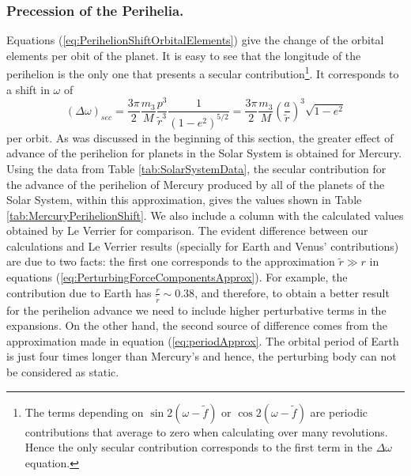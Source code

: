 \subsubsection{Precession of the Perihelia.}
Equations (\ref{eq:PerihelionShiftOrbitalElements}) give the change of the orbital elements per obit of the planet. It is easy to see that the longitude of the perihelion is the only one that presents a secular contribution\footnote{The terms depending on $\sin 2(\omega - \tilde{f})$ or $\cos 2(\omega - \tilde{f})$ are periodic contributions that average to zero when calculating over many revolutions. Hence the only secular contribution corresponds to the first term in the $\Delta \omega$ equation.}. It corresponds to a shift in $\omega$ of
\begin{equation}
\left( \Delta \omega \right)_{sec} = \frac{3 \pi}{2} \frac{m_3}{M} \frac{p^3}{\tilde{r}^3} \frac{1}{(1-e^2)^{5/2}} =  \frac{3 \pi}{2} \frac{m_3}{M} \left( \frac{a}{\tilde{r}} \right)^3  \sqrt{1-e^2}
\end{equation}
per orbit. As was discussed in the beginning of this section, the greater effect of advance of the perihelion for planets in the Solar System is obtained for Mercury. Using the data from Table \ref{tab:SolarSystemData}, the secular contribution for the advance of the perihelion of Mercury produced by all of the planets of the Solar System, within this approximation, gives the values shown in Table \ref{tab:MercuryPerihelionShift}. We also include a column with the calculated values obtained by Le Verrier \cite{LeVerrier1859, Krizek2017} for comparison. The evident difference between our calculations and Le Verrier results (specially for Earth and Venus' contributions) are due to two facts: the first one corresponds to the approximation $\tilde{r} \gg r$ in equations (\ref{eq:PerturbingForceComponentsApprox}). For example, the contribution due to Earth has $\frac{r}{\tilde{r}}  \sim  0.38$, and therefore, to obtain a better result for the perihelion advance we need to include higher perturbative terms in the expansions. On the other hand, the second source of difference comes from the approximation made in equation (\ref{eq:periodApprox}. The orbital period of Earth is just four times longer than Mercury's and hence, the perturbing body can not be considered as static. 

